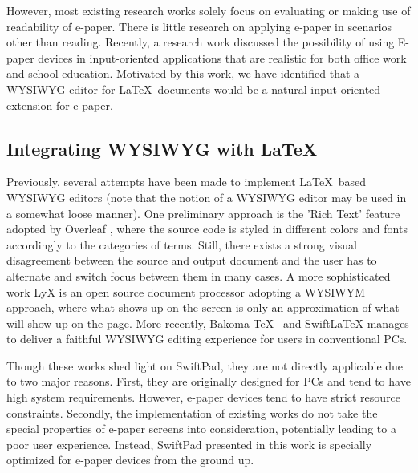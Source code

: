\documentclass[]{sigchi}
\begin{document}
However, most existing research works solely focus on evaluating or making use of readability of e-paper. There is little research on applying e-paper in scenarios other than reading. Recently, a research work \cite{wen2018going} discussed the possibility of using E-paper devices in input-oriented applications that are realistic for both office work and school education. Motivated by this work, we have identified that a WYSIWYG editor for \LaTeX\ documents would be a natural input-oriented extension for e-paper. 

\subsection{Integrating WYSIWYG with \LaTeX}
Previously, several attempts have been made to implement \LaTeX\ based WYSIWYG editors (note that the notion of a WYSIWYG editor may be used in a somewhat loose manner).
One preliminary approach is the 'Rich Text' feature adopted by Overleaf \cite{overleaf}, where the source code is styled in different colors and fonts accordingly to the categories of terms. 
Still, there exists a strong visual disagreement between the source and output document and the user has to alternate and switch focus between them in many cases.
A more sophisticated work LyX \cite{kastrup2002revisiting} is an open source document processor adopting a WYSIWYM approach, where what shows up on the screen is only an approximation of what will show up on the page.
More recently, Bakoma \TeX\ \cite{soft2011bakoma} and SwiftLaTeX \cite{elliott2018} manages to deliver a faithful WYSIWYG editing experience for users in conventional PCs.

Though these works shed light on SwiftPad, they are not directly applicable due to two major reasons. First, they are originally designed for PCs and tend to have high system requirements. However, e-paper devices tend to have strict resource constraints. Secondly, the implementation of existing works do not take the special properties of e-paper screens into consideration, potentially leading to a poor user experience. Instead, SwiftPad presented in this work is specially optimized for e-paper devices from the ground up.
\end{document}
